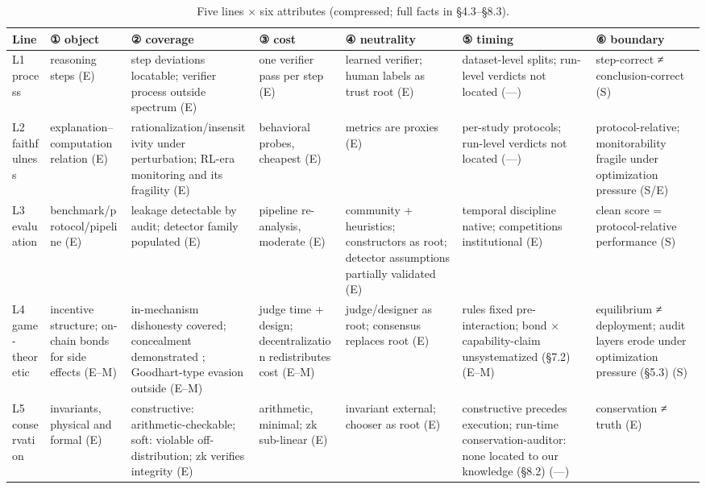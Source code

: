 \documentclass[11pt,a4paper]{article}
\begin{document}
\begin{table}[htbp]
\centering
\scriptsize
\setlength{\tabcolsep}{2.5pt}
\renewcommand{\arraystretch}{1.18}
\begin{tabularx}{0.985\textwidth}{>{\raggedright\arraybackslash}p{} *{6}{>{\raggedright\arraybackslash}p{}}}
\toprule
\textbf{Line} & \textbf{① object} & \textbf{② coverage} & \textbf{③ cost} & \textbf{④ neutrality} & \textbf{⑤ timing} & \textbf{⑥ boundary} \\
\midrule
L1 process \cite{key05,key06} & reasoning steps (E) & step deviations locatable; verifier process outside spectrum (E) & one verifier pass per step (E) & learned verifier; human labels as trust root (E) & dataset-level splits; run-level verdicts not located (—) & step-correct ≠ conclusion-correct (S) \\
L2 faithfulness \cite{key02,key03,key26,key27,key28,key29,key30} & explanation–computation relation (E) & rationaliza\-tion\slash insensitivity under perturbation; RL-era monitoring and its fragility \cite{key27,key28,key30} (E) & behavioral probes, cheapest (E) & metrics are proxies (E) & per-study protocols; run-level verdicts not located (—) & protocol-relative; monitorability fragile under optimization pressure \cite{key27,key29,key30} (S\slash E) \\
L3 evaluation \cite{key07,key08,key31,key32,key33,key34,key35,key36,key37} & benchmark\slash protocol\slash pipeline (E) & leakage detectable by audit; detector family populated \cite{key32,key33,key34,key35,key36,key37} (E) & pipeline re-analysis, moderate (E) & community + heuristics; constructors as root; detector assumptions partially validated \cite{key35} (E) & temporal discipline native; competitions institutional \cite{key31} (E) & clean score = protocol-relative performance (S) \\
L4 game-theoretic \cite{key09,key10,key38,key39,key40,key41,key42,key43,key44,key45} & incentive structure; on-chain bonds for side effects \cite{key42,key43,key44,key45} (E–M) & in-mechanism dishonesty covered; concealment demonstrated \cite{key27}; Goodhart-type evasion outside (E–M) & judge time + design; decentralization redistributes cost \cite{key39,key40,key41} (E–M) & judge\slash designer as root; consensus replaces root \cite{key39,key40,key41} (E) & rules fixed pre-interaction; bond × capability-claim unsystematized (§7.2) (E–M) & equilibrium ≠ deployment; audit layers erode under optimization pressure (§5.3) (S) \\
L5 conservation \cite{key11,key12,key13,key46,key47,key48} & invariants, physical and formal (E) & constructive: arithmetic-checkable; soft: violable off-distribution; zk verifies integrity \cite{key47} (E) & arithmetic, minimal; zk sub-linear \cite{key47} (E) & invariant external; chooser as root (E) & constructive precedes execution; run-time conservation-auditor: none located to our knowledge (§8.2) (—) & conservation ≠ truth (E) \\
\bottomrule
\end{tabularx}
\caption{Five lines × six attributes (compressed; full facts in §4.3–§8.3).}
\label{tab:T3}
\end{table}
\end{document}
